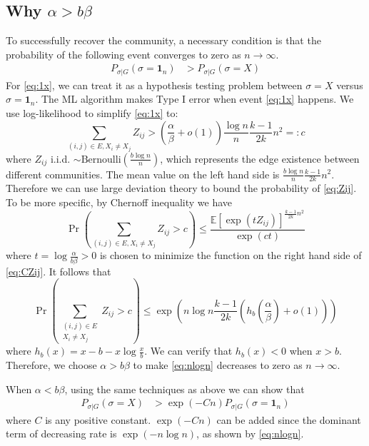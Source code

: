 \documentclass{article}
\begin{document}
\subsection{Why $\alpha > b \beta$}
To successfully recover the community, a necessary condition is that the probability of the following event converges to zero as $n\to\infty$.
\begin{align}
P_{\sigma | G}(\sigma =  \mathbf{1}_n) & > P_{\sigma | G}(\sigma = X) \label{eq:1x}
\end{align}
For \eqref{eq:1x}, we can treat it as a hypothesis testing problem between $\sigma = X$ versus $\sigma = \mathbf{1}_n$.
The ML algorithm makes Type I error when event \eqref{eq:1x} happens. We use log-likelihood to simplify
\eqref{eq:1x} to:
\begin{equation}\label{eq:Zij}
\sum_{(i,j)\in E, X_i \neq X_j} Z_{ij} > (\frac{\alpha}{\beta} + o(1)) \frac{\log n}{n} \frac{k-1}{2k}n^2 =: c
\end{equation}
where $Z_{ij}$ i.i.d. $\sim \textrm{Bernoulli}(\frac{b\log n }{n})$, which represents the edge existence between different communities. The mean value on the left hand side is $\frac{b \log n }{n} \frac{k-1}{2k}n^2$. Therefore we can use large
deviation theory to bound the probability of \eqref{eq:Zij}. To be more specific, by Chernoff inequality we have
\begin{equation}\label{eq:CZij}
\Pr\left(\sum_{(i,j)\in E, X_i \neq X_j} Z_{ij} >  c \right)\leq \frac{\mathbb{E}[\exp(t Z_{ij})]^{ \frac{k-1}{2k}n^2 }}{\exp(ct)}
\end{equation}
where $ t  = \log \frac{\alpha}{b\beta} > 0$ is chosen to minimize the function on the right hand side of \eqref{eq:CZij}. It follows that
\begin{equation}\label{eq:nlogn}
\Pr(\sum_{\substack{(i,j)\in E \\ X_i \neq X_j}} Z_{ij} >  c )\leq \exp(n\log n  \frac{k-1}{2k} (h_b(\frac{\alpha}{\beta}) + o(1)))
\end{equation}
where $h_b(x) = x - b - x \log\frac{x}{b}$. We can verify that $h_b(x) < 0 $ when $ x > b$.
Therefore, we choose $\alpha > b \beta$	to make \eqref{eq:nlogn} decreases to zero as $n\to\infty$.

When $\alpha < b \beta$, using the same techniques as above we can show that
\begin{align}
P_{\sigma | G}(\sigma = X ) & > \exp(-Cn) P_{\sigma | G}(\sigma = \mathbf{1}_n) \label{eq:1x_e}
\end{align}
where $C$ is any positive constant.
$\exp(-Cn)$ can be added since the dominant term of decreasing rate is $\exp(-n\log n)$, as shown by \eqref{eq:nlogn}.
\end{document}
